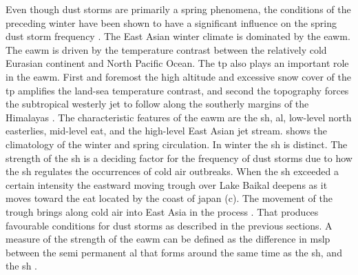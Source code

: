 Even though dust storms are primarily a spring phenomena, the conditions of the preceding winter have been shown to have a significant influence on the spring dust storm frequency \parencite{he2017impact, liu2018influence, gong2006simulated}. The East Asian winter climate is dominated by the \acrfull{eawm}. 
The \acrshort{eawm} is driven by the temperature contrast between the relatively cold Eurasian continent and North Pacific Ocean.
The \acrshort{tp} also plays an important role in the \acrshort{eawm}. First and foremost the high altitude and excessive snow cover of the \acrshort{tp} amplifies the land-sea temperature contrast, and second the topography forces the subtropical westerly jet to follow along the southerly margins of the Himalayas \parencite{tada2016evolution}. 
The characteristic features of the \acrshort{eawm} are the \acrfull{sh}, \acrfull{al}, low-level north easterlies, mid-level \acrfull{eat}, and the high-level East Asian jet stream. 
 shows the climatology of the winter and spring  circulation. 
In winter the \acrshort{sh} is distinct. 
The strength of the \acrshort{sh} is a deciding factor for the frequency of dust storms due to how the \acrshort{sh} regulates the occurrences of cold air outbreaks.
When the \acrshort{sh} exceeded a certain intensity the eastward moving trough over Lake Baikal deepens as it moves toward the \acrshort{eat} located by the coast of japan (c). 
The movement of the trough brings along cold air into East Asia in the process \parencite{he2017impact}. 
That produces favourable conditions for dust storms as described in the previous sections. 
A measure of the strength of the \acrshort{eawm} can be defined as the difference in \acrshort{mslp} between the semi permanent \acrshort{al} that forms around the same time as the \acrshort{sh}, and the \acrshort{sh} \parencite{yoshiike2009influence}. 

